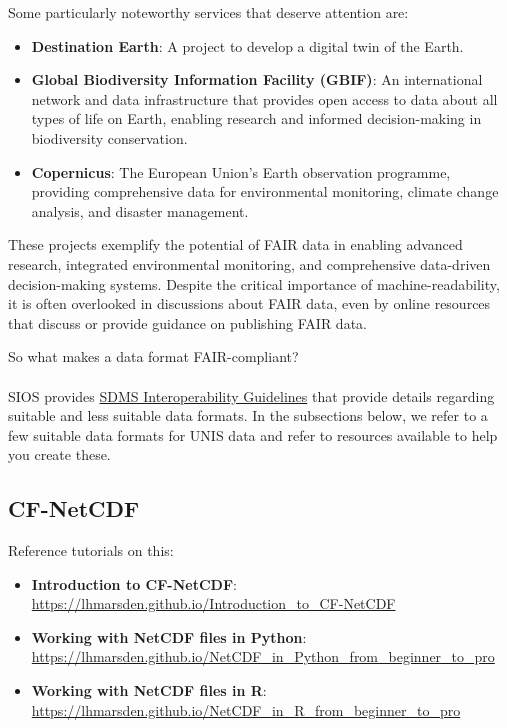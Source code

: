 \documentclass[a4paper,12pt]{article}
\begin{document}
Some particularly noteworthy services that deserve attention are:
\begin{itemize}
    \item \textbf{Destination Earth}: A project to develop a digital twin of the Earth.
    \item \textbf{Global Biodiversity Information Facility (GBIF)}: An international network and data infrastructure that provides open access to data about all types of life on Earth, enabling research and informed decision-making in biodiversity conservation.
    \item \textbf{Copernicus}: The European Union's Earth observation programme, providing comprehensive data for environmental monitoring, climate change analysis, and disaster management.
\end{itemize}

These projects exemplify the potential of FAIR data in enabling advanced research, integrated environmental monitoring, and comprehensive data-driven decision-making systems. Despite the critical importance of machine-readability, it is often overlooked in discussions about FAIR data, even by online resources that discuss or provide guidance on publishing FAIR data.

So what makes a data format FAIR-compliant? 
\\
\\

SIOS provides \href{https://sios-svalbard.org/sites/sios-svalbard.org/files/common/SDMS_Interoperability_Guidelines.pdf}{SDMS Interoperability Guidelines} that provide details regarding suitable and less suitable data formats. In the subsections below, we refer to a few suitable data formats for UNIS data and refer to resources available to help you create these.

\subsection{CF-NetCDF}

Reference tutorials on this:
\begin{itemize}
    \item \textbf{Introduction to CF-NetCDF}: \url{https://lhmarsden.github.io/Introduction_to_CF-NetCDF}
    \item \textbf{Working with NetCDF files in Python}: \url{https://lhmarsden.github.io/NetCDF_in_Python_from_beginner_to_pro} \citep{marsden_netcdf_python}
    \item \textbf{Working with NetCDF files in R}: \url{https://lhmarsden.github.io/NetCDF_in_R_from_beginner_to_pro} \citep{marsden_netcdf_r}
\end{itemize}
\end{document}
